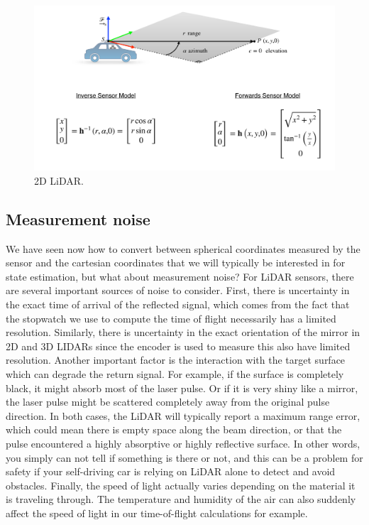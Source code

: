 \begin{figure}[!htb]
\begin{center}
\includegraphics[scale=0.280]{img/hardware/lidar_6.jpeg}
\end{center}
\caption{2D LiDAR.}
\label{lidar_6}
\end{figure}

\subsection{Measurement noise}

We have seen now how to convert between spherical coordinates measured by the sensor and the cartesian coordinates that 
we will typically be interested in for state estimation, but what about measurement noise? For LiDAR sensors, there are several important sources
of noise to consider. First, there is uncertainty in the exact time of arrival of the reflected signal, which comes from the fact that
the stopwatch we use to compute the time of flight necessarily
has a limited resolution. Similarly, there is uncertainty in the exact orientation of the mirror in 2D and 3D LIDARs since the encoder is used to measure
this also have limited resolution. Another important factor
is the interaction with the target surface which can
degrade the return signal. For example, if the surface
is completely black, it might absorb most of the laser pulse. Or if it is very shiny like a mirror, the laser pulse might be scattered completely away from
the original pulse direction. In both cases, the LiDAR will typically
report a maximum range error, which could mean there is empty space
along the beam direction, or that the pulse encountered a highly absorptive or
highly reflective surface. In other words, you simply can not
tell if something is there or not, and this can be a problem for
safety if your self-driving car is relying on LiDAR alone to
detect and avoid obstacles. Finally, the speed of light actually varies depending on the material
it is traveling through. The temperature and humidity
of the air can also suddenly affect the speed of light in our
time-of-flight calculations for example. 

